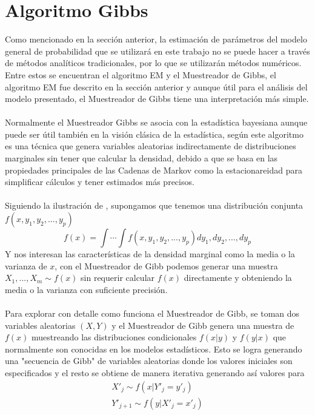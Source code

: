 \section{Algoritmo Gibbs}
Como mencionado en la secci\'on anterior, la estimaci\'on de par\'ametros del modelo general de probabilidad que se utilizar\'a en este trabajo no se puede hacer a trav\'es de m\'etodos anal\'iticos tradicionales, por lo que se utilizar\'an m\'etodos num\'ericos. Entre estos se encuentran el algoritmo EM y el Muestreador de Gibbs, el algoritmo EM fue descrito en la secci\'on anterior y aunque \'util para el an\'alisis del modelo presentado, el Muestreador de Gibbs tiene una interpretaci\'on m\'as simple.\\
\\
Normalmente el Muestreador Gibbs se asocia con la estad\'istica bayesiana aunque puede ser \'util tambi\'en en la visi\'on cl\'asica de la estad\'istica, seg\'un \cite{casella1992explaining} este algoritmo es una t\'ecnica que genera variables aleatorias indirectamente de distribuciones marginales sin tener que calcular la densidad, debido a que se basa en las propiedades principales de las Cadenas de Markov como la estacionareidad para simplificar c\'alculos y tener estimados m\'as precisos.\\
\\
Siguiendo la ilustraci\'on de \cite{casella1992explaining}, supongamos que tenemos una distribuci\'on conjunta $f(x,y_1,y_2,...,y_p)$\\
\[f(x)=\int \cdots \int f(x,y_1,y_2,...,y_p) dy_1,dy_2,...,dy_p\]
Y nos interesan las caracter\'isticas de la densidad marginal como la media o la varianza de $x$, con el Muestreador de Gibb podemos generar una muestra $X_1,...,X_m \sim f(x)$ sin requerir calcular $f(x)$ directamente y obteniendo la media o la varianza con suficiente precisi\'on.\\
\\
Para explorar con detalle como funciona el Muestreador de Gibb, se toman dos variables aleatorias $(X,Y)$ y el Muestreador de Gibb genera una muestra de $f(x)$ muestreando las distribuciones condicionales $f(x|y)$ y $f(y|x)$ que normalmente son conocidas en los modelos estad\'isticos. Esto se logra generando una "secuencia de Gibb" de variables aleatorias donde los valores iniciales son especificados y el resto se obtiene de manera iterativa generando as\'i valores para\\
\begin{align*}
X'_j \sim f(x|Y'_j=y'_j)\\
Y'_{j+1} \sim f(y|X'_j=x'_j)
\end{align*}
